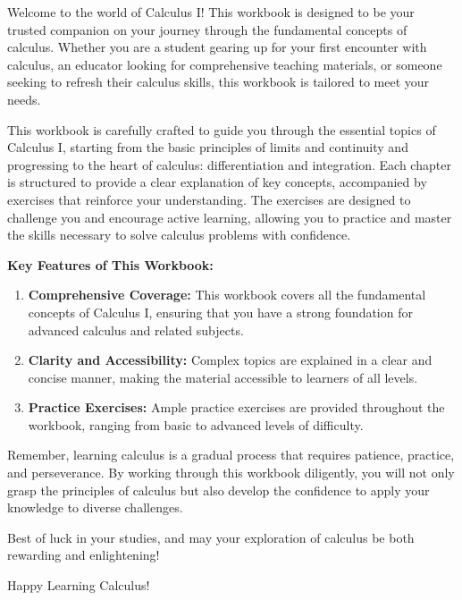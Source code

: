 
Welcome to the world of Calculus I! This workbook is designed to be your trusted companion on your journey through the fundamental concepts of calculus. Whether you are a student gearing up for your first encounter with calculus, an educator looking for comprehensive teaching materials, or someone seeking to refresh their calculus skills, this workbook is tailored to meet your needs.

This workbook is carefully crafted to guide you through the essential topics of Calculus I, starting from the basic principles of limits and continuity and progressing to the heart of calculus: differentiation and integration. Each chapter is structured to provide a clear explanation of key concepts, accompanied by exercises that reinforce your understanding. The exercises are designed to challenge you and encourage active learning, allowing you to practice and master the skills necessary to solve calculus problems with confidence.

\vspace{1cm}

\noindent \textbf{Key Features of This Workbook:}

\begin{enumerate}
	\item \textbf{Comprehensive Coverage:} This workbook covers all the fundamental concepts of Calculus I, ensuring that you have a strong foundation for advanced calculus and related subjects.
	\item \textbf{Clarity and Accessibility:} Complex topics are explained in a clear and concise manner, making the material accessible to learners of all levels.
	\item \textbf{Practice Exercises:} Ample practice exercises are provided throughout the workbook, ranging from basic to advanced levels of difficulty.
\end{enumerate}

Remember, learning calculus is a gradual process that requires patience, practice, and perseverance. By working through this workbook diligently, you will not only grasp the principles of calculus but also develop the confidence to apply your knowledge to diverse challenges.

Best of luck in your studies, and may your exploration of calculus be both rewarding and enlightening!

Happy Learning Calculus!
